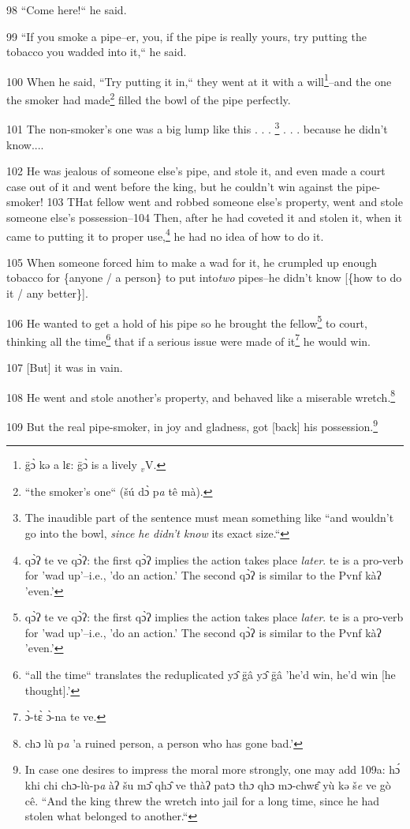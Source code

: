 98 ``Come here!`` he said.

99 ``If you smoke a pipe--er, you, if the pipe is really yours, try putting
the tobacco you wadded into it,`` he said.

100 When he said, ``Try putting it in,`` they went at it with a
will\footnote{g̈ɔ̀ kə a lɛ: g̈ɔ̀ is a lively $_{v}$V.}--and the one the smoker had made\footnote{``the smoker's one`` (šú dɔ̀ p\emph{a} tê mà).} filled the bowl of the pipe perfectly.

101 The non-smoker's one was a big lump like this . . . \footnote{The inaudible part of the sentence must mean something like ``and wouldn't go into the bowl, \textit{since he didn't know} its exact size.``} . . . because he didn't
know....

102 He was jealous of someone else's pipe, and stole it, and even made a court
case out of it and went before the king, but he couldn't win against the pipe-smoker!
103 THat fellow went and robbed someone else's property, went and stole someone
else's possession--104 Then, after he had coveted it and stolen it, when it came
to putting it to proper use,\footnote{qɔ̀ʔ te ve qɔ̀ʔ: the first qɔ̀ʔ implies the action takes place \textit{later}. te is a pro-verb for 'wad up'--i.e., 'do an action.' The second qɔ̀ʔ is similar to the Pvnf kàʔ 'even.'} he had no idea of how to do it.

105 When someone forced him to make a wad for it, he crumpled up enough tobacco
for \{anyone / a person\} to put into\textit{two} pipes--he didn't know [\{how
to do it / any better\}].

106 He wanted to get a hold of his pipe so he brought the fellow\footnote{qɔ̀ʔ te ve qɔ̀ʔ: the first qɔ̀ʔ implies the action takes place \textit{later}. te is a pro-verb for 'wad up'--i.e., 'do an action.' The second qɔ̀ʔ is similar to the Pvnf kàʔ 'even.'} to court,
thinking all the time\footnote{``all the time`` translates the reduplicated yɔ̂ g̈â yɔ̂ g̈â 'he'd win, he'd win [he thought].'} that if a serious issue were made of it\footnote{ɔ̀-tɛ̀ ɔ̀-na te ve.} he would
win.

107 [But] it was in vain.

108 He went and stole another's property, and behaved like a miserable wretch.\footnote{chɔ lù p\emph{a} 'a ruined person, a person who has gone bad.'}

109 But the real pipe-smoker, in joy and gladness, got [back] his possession.\footnote{In case one desires to impress the moral more strongly, one may add 109a: hɔ́ khi chi chɔ-lù-p\emph{a} àʔ šu mɔ̂ qhɔ̂ ve thàʔ patɔ th\emph{ɔ} qhɔ mɔ-chwɛ̂ yù kə š\emph{e} ve gò cê. ``And the king threw the wretch into jail for a long time, since he had stolen what belonged to another.``}

